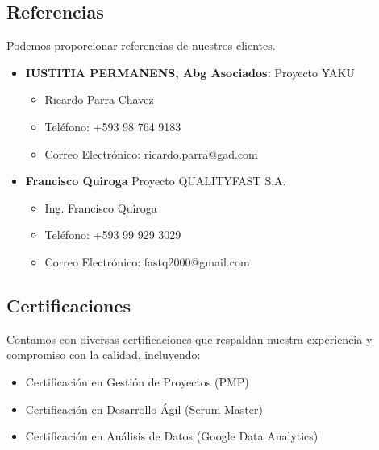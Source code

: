 \subsection{Referencias}
Podemos proporcionar referencias de nuestros clientes.
\begin{itemize}
    \item \textbf{IUSTITIA PERMANENS, Abg Asociados:} Proyecto YAKU
    \begin{itemize}
        \item Ricardo Parra Chavez
        \item Teléfono: +593 98 764 9183
        \item Correo Electrónico: ricardo.parra@gad.com
    \end{itemize}
    \item \textbf{Francisco Quiroga} Proyecto QUALITYFAST S.A.
    \begin{itemize}
        \item Ing. Francisco Quiroga
        \item Teléfono: +593 99 929 3029
        \item Correo Electrónico: fastq2000@gmail.com
    \end{itemize}
\end{itemize}

\subsection{Certificaciones}
Contamos con diversas certificaciones que respaldan nuestra experiencia y compromiso con la calidad, incluyendo:
\begin{itemize}
    \item Certificación en Gestión de Proyectos (PMP)
    \item Certificación en Desarrollo Ágil (Scrum Master)
    \item Certificación en Análisis de Datos (Google Data Analytics)
\end{itemize}
